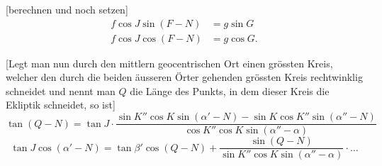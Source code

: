 \documentclass[12pt,a4paper]{article}
\begin{document}
\newpage

[berechnen und noch setzen]
\begin{align*}
f\cos J\sin(F - N) &= g\sin G \\
f\cos J\cos(F - N) &= g\cos G.
\end{align*}

[Legt man nun durch den mittlern geocentrischen Ort einen gr\"ossten
Kreis, welcher den durch die beiden \"ausseren \"Orter gehenden gr\"ossten Kreis
rechtwinklig schneidet und nennt man $Q$ die L\"ange des Punkts, in dem
dieser Kreis die Ekliptik schneidet, so ist]
\begin{equation}\tag{VI}
\tan(Q - N) = \tan J \cdot \frac{\sin K''\cos K \sin(\alpha' - N) - \sin K\cos K''\sin(\alpha'' - N)}{\cos K''\cos K \sin(\alpha'' - \alpha)}
\end{equation}
\begin{equation}
\tan J \cos(\alpha' - N) = \tan\beta' \cos(Q - N) + \frac{\sin(Q - N)}{\sin K''\cos K \sin(\alpha'' - \alpha)} \cdot \ldots
\end{equation}
\end{document}
